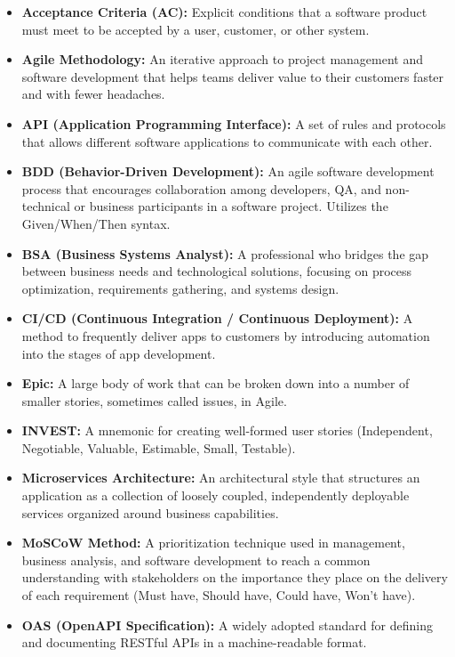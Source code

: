 \begin{itemize}
\tightlist
\item
  \textbf{Acceptance Criteria (AC):} Explicit conditions that a software
  product must meet to be accepted by a user, customer, or other system.
\item
  \textbf{Agile Methodology:} An iterative approach to project
  management and software development that helps teams deliver value to
  their customers faster and with fewer headaches.
\item
  \textbf{API (Application Programming Interface):} A set of rules and
  protocols that allows different software applications to communicate
  with each other.
\item
  \textbf{BDD (Behavior-Driven Development):} An agile software
  development process that encourages collaboration among developers,
  QA, and non-technical or business participants in a software project.
  Utilizes the Given/When/Then syntax.
\item
  \textbf{BSA (Business Systems Analyst):} A professional who bridges
  the gap between business needs and technological solutions, focusing
  on process optimization, requirements gathering, and systems design.
\item
  \textbf{CI/CD (Continuous Integration / Continuous Deployment):} A
  method to frequently deliver apps to customers by introducing
  automation into the stages of app development.
\item
  \textbf{Epic:} A large body of work that can be broken down into a
  number of smaller stories, sometimes called issues, in Agile.
\item
  \textbf{INVEST:} A mnemonic for creating well-formed user stories
  (Independent, Negotiable, Valuable, Estimable, Small, Testable).
\item
  \textbf{Microservices Architecture:} An architectural style that
  structures an application as a collection of loosely coupled,
  independently deployable services organized around business
  capabilities.
\item
  \textbf{MoSCoW Method:} A prioritization technique used in management,
  business analysis, and software development to reach a common
  understanding with stakeholders on the importance they place on the
  delivery of each requirement (Must have, Should have, Could have,
  Won't have).
\item
  \textbf{OAS (OpenAPI Specification):} A widely adopted standard for
  defining and documenting RESTful APIs in a machine-readable format.

\end{itemize}
